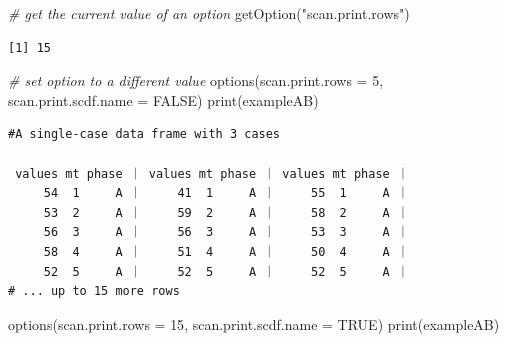 \documentclass[
]{book}
\newenvironment{Shaded}{\begin{snugshade}}{\end{snugshade}}
\newcommand{\AttributeTok}[1]{\textcolor[rgb]{0.77,0.63,0.00}{#1}}
\newcommand{\CommentTok}[1]{\textcolor[rgb]{0.56,0.35,0.01}{\textit{#1}}}
\newcommand{\ConstantTok}[1]{\textcolor[rgb]{0.00,0.00,0.00}{#1}}
\newcommand{\DecValTok}[1]{\textcolor[rgb]{0.00,0.00,0.81}{#1}}
\newcommand{\FunctionTok}[1]{\textcolor[rgb]{0.00,0.00,0.00}{#1}}
\newcommand{\NormalTok}[1]{#1}
\newcommand{\StringTok}[1]{\textcolor[rgb]{0.31,0.60,0.02}{#1}}
\begin{document}
\begin{Shaded}
\begin{Highlighting}[]
\CommentTok{\# get the current value of an option}
\FunctionTok{getOption}\NormalTok{(}\StringTok{"scan.print.rows"}\NormalTok{)}
\end{Highlighting}
\end{Shaded}

\begin{verbatim}
[1] 15
\end{verbatim}

\begin{Shaded}
\begin{Highlighting}[]
\CommentTok{\# set option to a different value}
\FunctionTok{options}\NormalTok{(}\AttributeTok{scan.print.rows =} \DecValTok{5}\NormalTok{, }\AttributeTok{scan.print.scdf.name =} \ConstantTok{FALSE}\NormalTok{)}
\FunctionTok{print}\NormalTok{(exampleAB)}
\end{Highlighting}
\end{Shaded}

\begin{verbatim}
#A single-case data frame with 3 cases

 values mt phase ｜ values mt phase ｜ values mt phase ｜
     54  1     A ｜     41  1     A ｜     55  1     A ｜
     53  2     A ｜     59  2     A ｜     58  2     A ｜
     56  3     A ｜     56  3     A ｜     53  3     A ｜
     58  4     A ｜     51  4     A ｜     50  4     A ｜
     52  5     A ｜     52  5     A ｜     52  5     A ｜
# ... up to 15 more rows
\end{verbatim}

\begin{Shaded}
\begin{Highlighting}[]
\FunctionTok{options}\NormalTok{(}\AttributeTok{scan.print.rows =} \DecValTok{15}\NormalTok{, }\AttributeTok{scan.print.scdf.name =} \ConstantTok{TRUE}\NormalTok{)}
\FunctionTok{print}\NormalTok{(exampleAB)}
\end{Highlighting}
\end{Shaded}
\end{document}
